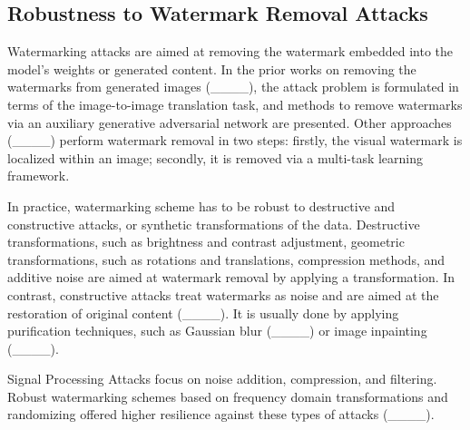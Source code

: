 \subsection{Robustness to Watermark Removal Attacks}
Watermarking attacks are aimed at removing the watermark embedded into the model's weights or generated content. In the prior works on removing the watermarks from generated images (____), the attack problem is formulated in terms of the image-to-image translation task, and methods to remove watermarks via an auxiliary generative adversarial network are presented. Other approaches (____) perform watermark removal in two steps: firstly, the visual watermark is localized within an image; secondly, it is removed via a multi-task learning framework. 

In practice, watermarking scheme has to be robust to destructive and constructive attacks, or synthetic transformations of the data. Destructive transformations,  such as brightness and contrast adjustment, geometric transformations, such as rotations and translations, compression methods, and additive noise are aimed at watermark removal by applying a transformation. In contrast, constructive attacks treat watermarks as noise and are aimed at the restoration of original content (____). It is usually done by applying purification techniques, such as Gaussian blur (____) or image inpainting (____).

Signal Processing Attacks focus on noise addition, compression, and filtering. Robust watermarking schemes based on frequency domain transformations and randomizing offered higher resilience against these types of attacks (____).